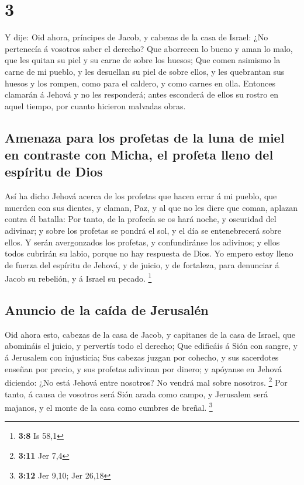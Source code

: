 \hypertarget{section-2}{%
\section{3}\label{section-2}}

 Y dije: Oid ahora, príncipes de Jacob, y cabezas de la casa
de Israel: ¿No pertenecía á vosotros saber el derecho?  Que
aborrecen lo bueno y aman lo malo, que les quitan su piel y su carne de
sobre los huesos;  Que comen asimismo la carne de mi pueblo,
y les desuellan su piel de sobre ellos, y les quebrantan sus huesos y
los rompen, como para el caldero, y como carnes en olla. 
Entonces clamarán á Jehová y no les responderá; antes esconderá de ellos
su rostro en aquel tiempo, por cuanto hicieron malvadas obras.

\hypertarget{amenaza-para-los-profetas-de-la-luna-de-miel-en-contraste-con-micha-el-profeta-lleno-del-espuxedritu-de-dios}{%
\subsection{Amenaza para los profetas de la luna de miel en contraste
con Micha, el profeta lleno del espíritu de
Dios}\label{amenaza-para-los-profetas-de-la-luna-de-miel-en-contraste-con-micha-el-profeta-lleno-del-espuxedritu-de-dios}}

 Así ha dicho Jehová acerca de los profetas que hacen errar
á mi pueblo, que muerden con sus dientes, y claman, Paz, y al que no les
diere que coman, aplazan contra él batalla:  Por tanto, de
la profecía se os hará noche, y oscuridad del adivinar; y sobre los
profetas se pondrá el sol, y el día se entenebrecerá sobre ellos.
 Y serán avergonzados los profetas, y confundiránse los
adivinos; y ellos todos cubrirán su labio, porque no hay respuesta de
Dios.  Yo empero estoy lleno de fuerza del espíritu de
Jehová, y de juicio, y de fortaleza, para denunciar á Jacob su rebelión,
y á Israel su pecado. \footnote{\textbf{3:8} Is 58,1}

\hypertarget{anuncio-de-la-cauxedda-de-jerusaluxe9n}{%
\subsection{Anuncio de la caída de
Jerusalén}\label{anuncio-de-la-cauxedda-de-jerusaluxe9n}}

 Oid ahora esto, cabezas de la casa de Jacob, y capitanes de
la casa de Israel, que abomináis el juicio, y pervertís todo el derecho;
 Que edificáis á Sión con sangre, y á Jerusalem con
injusticia;  Sus cabezas juzgan por cohecho, y sus
sacerdotes enseñan por precio, y sus profetas adivinan por dinero; y
apóyanse en Jehová diciendo: ¿No está Jehová entre nosotros? No vendrá
mal sobre nosotros. \footnote{\textbf{3:11} Jer 7,4}  Por
tanto, á causa de vosotros será Sión arada como campo, y Jerusalem será
majanos, y el monte de la casa como cumbres de breñal. \footnote{\textbf{3:12}
  Jer 9,10; Jer 26,18}

